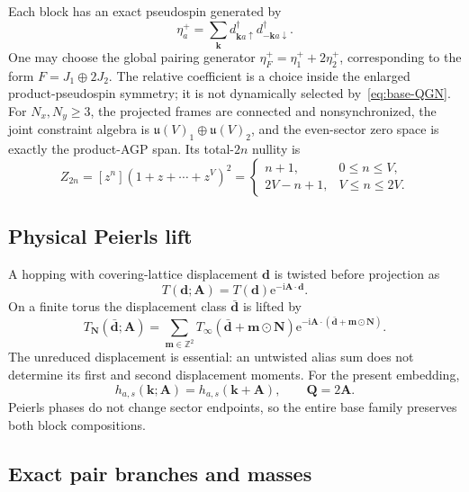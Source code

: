 \documentclass[11pt]{article}
\theoremstyle{remark}
\newcommand{\I}{\mathrm i}
\newcommand{\e}{\mathrm e}
\newcommand{\bmA}{\bm A}
\newcommand{\bmk}{\bm k}
\newcommand{\bmQ}{\bm Q}
\begin{document}
Each block has an exact pseudospin generated by
\begin{equation}
\eta_a^+=\sum_{\bmk}
 d_{\bmk a\uparrow}^\dagger d_{-\bmk a\downarrow}^\dagger.
\end{equation}
One may choose the global pairing generator $\eta_F^+=\eta_1^++2\eta_2^+$, corresponding to the form $F=J_1\oplus2J_2$.  The relative coefficient is a choice inside the enlarged product-pseudospin symmetry; it is not dynamically selected by~\eqref{eq:base-QGN}.  For $N_x,N_y\ge3$, the projected frames are connected and nonsynchronized, the joint constraint algebra is $\mathfrak u(V)_1\oplus\mathfrak u(V)_2$, and the even-sector zero space is exactly the product-AGP span.  Its total-$2n$ nullity is
\begin{equation}
Z_{2n}=[z^n](1+z+\cdots+z^V)^2
=\begin{cases}
n+1,&0\le n\le V,\\
2V-n+1,&V\le n\le2V.
\end{cases}
\label{eq:base-nullity}
\end{equation}

\subsection{Physical Peierls lift}

A hopping with covering-lattice displacement $\bm d$ is twisted before projection as
\begin{equation}
T(\bm d;\bmA)=T(\bm d)\e^{-\I\bmA\cdot\bm d}.
\label{eq:peierls-cover}
\end{equation}
On a finite torus the displacement class $\bar{\bm d}$ is lifted by
\begin{equation}
T_{\bm N}(\bar{\bm d};\bmA)
=\sum_{\bm m\in\mathbb Z^2}
T_\infty(\bar{\bm d}+\bm m\odot\bm N)
\e^{-\I\bmA\cdot(\bar{\bm d}+\bm m\odot\bm N)}.
\label{eq:torus-lift}
\end{equation}
The unreduced displacement is essential: an untwisted alias sum does not determine its first and second displacement moments.  For the present embedding,
\begin{equation}
h_{a,s}(\bmk;\bmA)=h_{a,s}(\bmk+\bmA),
\qquad
\bmQ=2\bmA.
\end{equation}
Peierls phases do not change sector endpoints, so the entire base family preserves both block compositions.

\subsection{Exact pair branches and masses}
\end{document}
